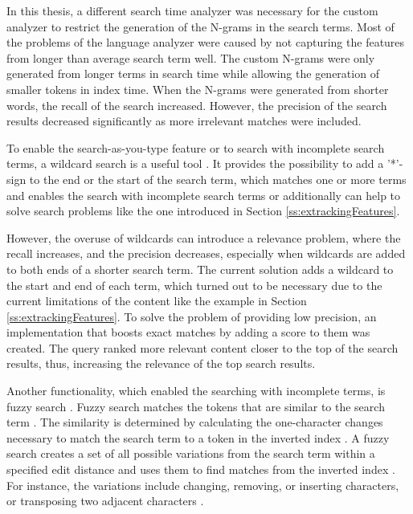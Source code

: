 In this thesis, a different search time analyzer was necessary for the custom analyzer to restrict 
the generation of the N-grams in the search terms. 
Most of the problems of the language analyzer were caused by not capturing the features
from longer than average search term well.
The custom N-grams were only generated from longer terms in search time 
while allowing the generation of smaller tokens in index time.
When the N-grams were generated from shorter words, the recall of the search increased.
However, the precision of the search results decreased significantly as more irrelevant matches were included.


To enable the search-as-you-type feature or to search with incomplete search terms, a wildcard search is 
a useful tool \cite{relevantSearch}.
It provides the possibility to add a '*'-sign to the end or the start of the search term, which matches one or more
terms and enables the search with incomplete search terms or additionally can help to solve search problems like
the one introduced in Section \ref{ss:extrackingFeatures}.


However, the overuse of wildcards can introduce a relevance problem, where the recall increases, and 
the precision decreases, especially when wildcards are added to both ends of a shorter search term. 
The current solution adds a wildcard to the start and end of each term, which turned out to be necessary
due to the current limitations of the content like the example in Section \ref{ss:extrackingFeatures}.
To solve the problem of providing low precision, an implementation that boosts exact matches
by adding a score to them was created.
The query ranked more relevant content closer to the top of the search results, thus, increasing
the relevance of the top search results.


Another functionality, which enabled the searching with incomplete terms, 
is fuzzy search \cite{relevantSearch}.
Fuzzy search matches the tokens that are similar to the search term \cite{elasticIntro}. 
The similarity is determined by calculating the one-character 
changes necessary to match the search term to a token in the inverted index \cite{elasticIntro}.
A fuzzy search creates a set of all possible variations from the search term within a specified edit distance
and uses them to find matches from the inverted index \cite{elasticIntro}.
For instance, the variations include changing, removing, or inserting characters, or transposing two adjacent characters 
\cite{elasticIntro}.


